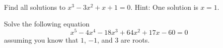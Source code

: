\begin{prob}
Find all solutions to $x^3-3x^2+x+1=0$.  Hint:  One solution is $x=1$.  
\end{prob}

\begin{prob}
Solve the following equation
\[
x^5 - 4x^4 - 18x^3 + 64x^2 + 17x -60 = 0
\]
assuming you know that $1$, $-1$, and $3$ are roots.
\end{prob}

